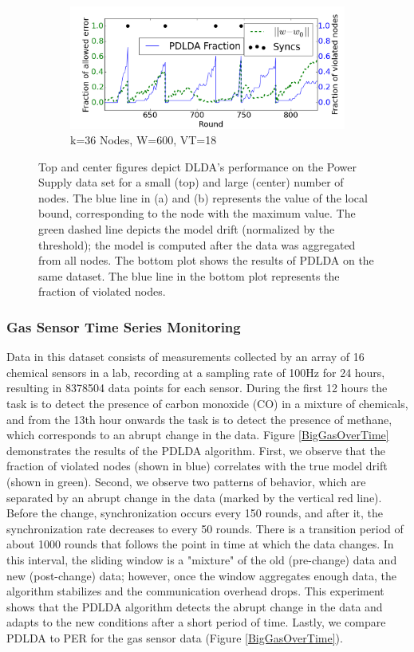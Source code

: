 \begin{figure}
    \begin{subfigure}[b]{0.5\textwidth}
        \includegraphics[width=\textwidth]{graphics/36nodesProb.png}
        \caption{k=36 Nodes, W=600, VT=18}
    \end{subfigure}
    \caption{Top and center figures depict DLDA's performance on the Power Supply data set for a small (top) and large (center) number of nodes. The blue line in (a) and (b) represents the value of the local bound, corresponding to the node with the maximum value. The green dashed line depicts the model drift (normalized by the threshold); the model is computed after the data was aggregated from all nodes. The bottom plot shows the results of PDLDA on the same dataset. The blue line in the bottom plot represents the fraction of violated nodes.}\label{PowerSupplyFigures}
\end{figure}
	
\subsubsection{Gas Sensor Time Series Monitoring} 
%
Data in this dataset \cite{fonollosa2015reservoir} consists of measurements collected
by an array of 16 chemical sensors in a lab, recording at a sampling
rate of 100Hz for 24 hours, resulting in 8378504 data points for each sensor.
During the first 12 hours the task is to detect the presence of carbon monoxide
(CO) in a mixture of chemicals, and from the 13th hour onwards the task is to detect the presence of methane, 
which corresponds to an abrupt change in the data.
Figure \ref{BigGasOverTime} demonstrates the results of the PDLDA algorithm.
First, we observe that the fraction of violated nodes (shown in blue) correlates with the true model drift (shown in green). Second, we observe two patterns of behavior, which are separated by an abrupt change in the data  (marked by the vertical red line). Before the change,  synchronization occurs every 150 rounds, and after it, 
the synchronization rate decreases to every 50 rounds. There is a transition period of about 1000 rounds that follows the point in time at which the data changes. In this interval, the sliding window is a "mixture" of the old (pre-change) data and new (post-change) data; however, once the window aggregates enough data, the algorithm stabilizes and the communication overhead drops. This experiment shows that the PDLDA algorithm detects the abrupt change in the data and adapts to the new conditions after a short period of time.
Lastly, we compare PDLDA to PER for the gas sensor data (Figure \ref{BigGasOverTime}).

